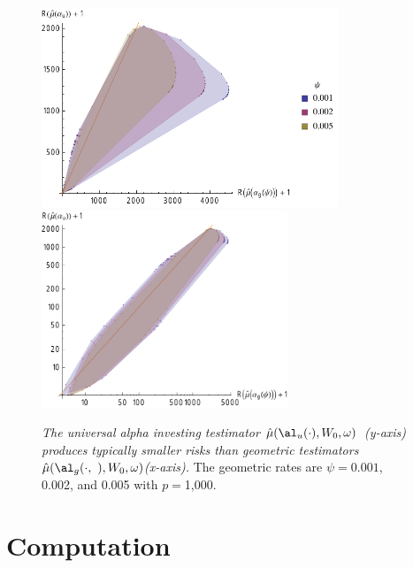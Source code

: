 \documentclass[12pt]{article}
\newcommand{\uTest}{\mbox{$\hat\mu(\al_u(\cdot),W_0,\omega)$}}
\newcommand{\gTest}[1]{\mbox{$\hat\mu(\al_g(\cdot,{#1}),W_0,\omega)$}}
\begin{document}
 \begin{figure}
 \caption{ \label{fig:univGeo} {\sl The universal alpha investing testimator \uTest\ (y-axis) produces typically smaller risks than geometric testimators \gTest\ (x-axis).}  The geometric rates are $\psi = 0.001$, 0.002, and 0.005 with $p=$1,000.}

 \vspace{0.1in}
 \centerline{
     \includegraphics[width=3.5in]{figures/univGeo}
     \includegraphics[width=2.9in]{figures/univGeoLog} }
 \vspace{0.2in}
 \end{figure}



\section{ Computation }
\end{document}
